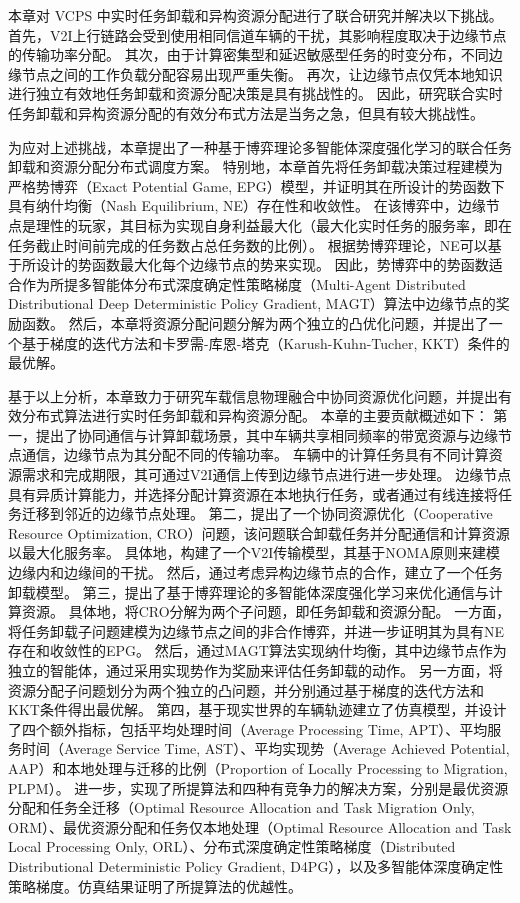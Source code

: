 本章对 VCPS 中实时任务卸载和异构资源分配进行了联合研究并解决以下挑战。
首先，V2I上行链路会受到使用相同信道车辆的干扰，其影响程度取决于边缘节点的传输功率分配。
其次，由于计算密集型和延迟敏感型任务的时变分布，不同边缘节点之间的工作负载分配容易出现严重失衡。
再次，让边缘节点仅凭本地知识进行独立有效地任务卸载和资源分配决策是具有挑战性的。
因此，研究联合实时任务卸载和异构资源分配的有效分布式方法是当务之急，但具有较大挑战性。

为应对上述挑战，本章提出了一种基于博弈理论多智能体深度强化学习的联合任务卸载和资源分配分布式调度方案。
特别地，本章首先将任务卸载决策过程建模为严格势博弈（Exact Potential Game, EPG）\cite{chew2016potential}模型，并证明其在所设计的势函数下具有纳什均衡（Nash Equilibrium, NE）存在性和收敛性。
在该博弈中，边缘节点是理性的玩家，其目标为实现自身利益最大化（最大化实时任务的服务率，即在任务截止时间前完成的任务数占总任务数的比例）。
根据势博弈理论，NE可以基于所设计的势函数最大化每个边缘节点的势来实现。
因此，势博弈中的势函数适合作为所提多智能体分布式深度确定性策略梯度（Multi-Agent Distributed Distributional Deep Deterministic Policy Gradient, MAGT）算法中边缘节点的奖励函数。
然后，本章将资源分配问题分解为两个独立的凸优化问题，并提出了一个基于梯度的迭代方法和卡罗需-库恩-塔克（Karush-Kuhn-Tucher, KKT）条件的最优解。

基于以上分析，本章致力于研究车载信息物理融合中协同资源优化问题，并提出有效分布式算法进行实时任务卸载和异构资源分配。
本章的主要贡献概述如下：
第一，提出了协同通信与计算卸载场景，其中车辆共享相同频率的带宽资源与边缘节点通信，边缘节点为其分配不同的传输功率。
车辆中的计算任务具有不同计算资源需求和完成期限，其可通过V2I通信上传到边缘节点进行进一步处理。
边缘节点具有异质计算能力，并选择分配计算资源在本地执行任务，或者通过有线连接将任务迁移到邻近的边缘节点处理。
第二，提出了一个协同资源优化（Cooperative Resource Optimization, CRO）问题，该问题联合卸载任务并分配通信和计算资源以最大化服务率。
具体地，构建了一个V2I传输模型，其基于NOMA原则来建模边缘内和边缘间的干扰。
然后，通过考虑异构边缘节点的合作，建立了一个任务卸载模型。
第三，提出了基于博弈理论的多智能体深度强化学习来优化通信与计算资源。
具体地，将CRO分解为两个子问题，即任务卸载和资源分配。
一方面，将任务卸载子问题建模为边缘节点之间的非合作博弈，并进一步证明其为具有NE存在和收敛性的EPG。
然后，通过MAGT算法实现纳什均衡，其中边缘节点作为独立的智能体，通过采用实现势作为奖励来评估任务卸载的动作。
另一方面，将资源分配子问题划分为两个独立的凸问题，并分别通过基于梯度的迭代方法和KKT条件得出最优解。
第四，基于现实世界的车辆轨迹建立了仿真模型，并设计了四个额外指标，包括平均处理时间（Average Processing Time, APT）、平均服务时间（Average Service Time, AST）、平均实现势（Average Achieved Potential, AAP）和本地处理与迁移的比例（Proportion of Locally Processing to Migration, PLPM）。
进一步，实现了所提算法和四种有竞争力的解决方案，分别是最优资源分配和任务全迁移（Optimal Resource Allocation and Task Migration Only, ORM）、最优资源分配和任务仅本地处理（Optimal Resource Allocation and Task Local Processing Only, ORL）、分布式深度确定性策略梯度（Distributed Distributional Deterministic Policy Gradient, D4PG）\cite{barth2018distributed}，以及多智能体深度确定性策略梯度\cite{zhang2021adaptive}。仿真结果证明了所提算法的优越性。

